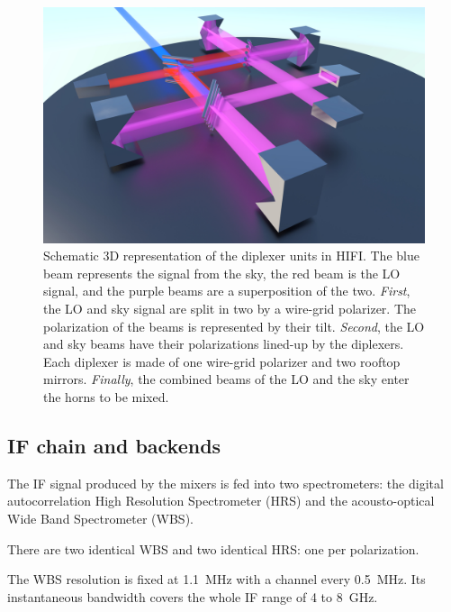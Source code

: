 \begin{figure}
    \centering
    \includegraphics[width=\textwidth]{diplexer_render_lowres}
    \caption{
        Schematic 3D representation of the diplexer units in HIFI.
        The blue beam represents the signal from the sky, the red beam is the LO signal,
        and the purple beams are a superposition of the two.
        \emph{First}, the LO and sky signal are split in two by a wire-grid polarizer.
        The polarization of the beams is represented by their tilt.
        \emph{Second}, the LO and sky beams have their polarizations lined-up by the diplexers.
        Each diplexer is made of one wire-grid polarizer and two rooftop mirrors.
        \emph{Finally}, the combined beams of the LO and the sky enter the horns to be mixed.
    }
    \label{fig:diplexer_render}
\end{figure}



\subsection{IF chain and backends}

The IF signal produced by the mixers is fed into two spectrometers:
the digital autocorrelation High Resolution Spectrometer (HRS) and
the acousto-optical Wide Band Spectrometer (WBS).

There are two identical WBS and two identical HRS: one per polarization.

The WBS resolution is fixed at \SI{1.1}{\mega\hertz} with a channel every \SI{0.5}{\mega\hertz}.
Its instantaneous bandwidth covers the whole IF range of 4 to \SI{8}{\giga\hertz}.

